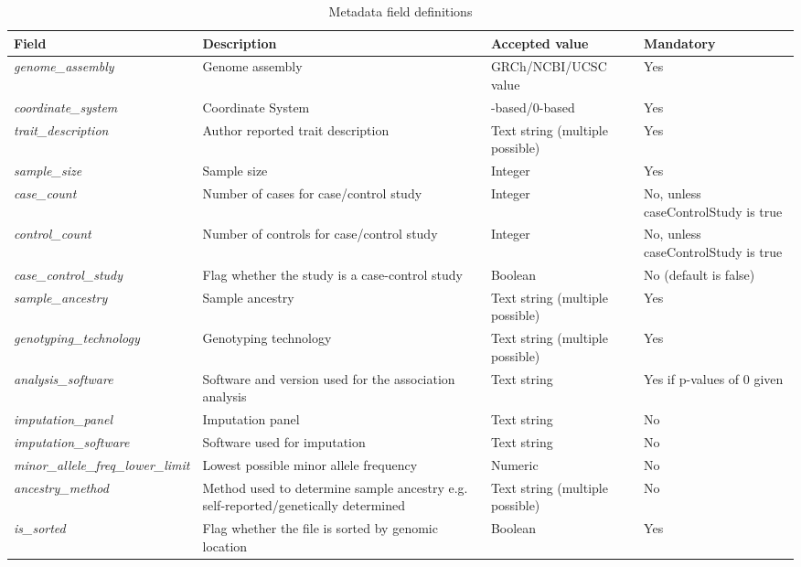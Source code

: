 \documentclass[11pt]{article}
\begin{document}
\begin{table}[h]
 \caption{Metadata field definitions}
 \centering
 \begin{tabularx}{\textwidth} { 
   | >{\hsize=1.4\hsize\centering\arraybackslash}X 
   | >{\hsize=1\hsize\centering\arraybackslash}X 
   | >{\hsize=1\hsize\centering\arraybackslash}X 
   | >{\hsize=0.6\hsize\centering\arraybackslash}X | } 
  \hline
  Field & Description & Accepted value & Mandatory \\
  \hline
  \textit{genome\_assembly} & Genome assembly & GRCh/NCBI/UCSC value & Yes\\
  \textit{coordinate\_system} & Coordinate System & 1-based/0-based & Yes\\
  \textit{trait\_description} & Author reported trait description & Text string (multiple possible) & Yes\\
  \textit{sample\_size} & Sample size & Integer & Yes\\
  \textit{case\_count} & Number of cases for case/control study & Integer & No, unless caseControlStudy is true\\
  \textit{control\_count} & Number of controls for case/control study & Integer & No, unless caseControlStudy is true\\
  \textit{case\_control\_study} & Flag whether the study is a case-control study & Boolean & No (default is false)\\
  \textit{sample\_ancestry} & Sample ancestry & Text string (multiple possible) & Yes\\
  \textit{genotyping\_technology} & Genotyping technology & Text string (multiple possible) & Yes\\
  \textit{analysis\_software} & Software and version used for the association analysis & Text string & Yes if p-values of 0 given\\
  \textit{imputation\_panel} & Imputation panel & Text string & No\\
  \textit{imputation\_software} & Software used for imputation & Text string & No\\
  \textit{minor\_allele\_freq\_lower\_limit} & Lowest possible minor allele frequency & Numeric & No\\
  \textit{ancestry\_method} & Method used to determine sample ancestry e.g. self-reported/genetically determined  & Text string (multiple possible) & No\\
  \textit{is\_sorted} & Flag whether the file is sorted by genomic location & Boolean & Yes\\

\end{tabularx}
\end{table}
\end{document}
